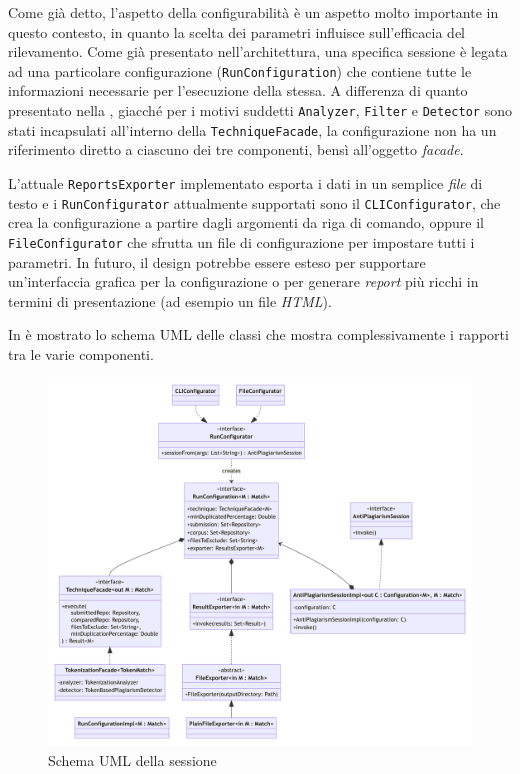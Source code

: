 Come già detto, l'aspetto della configurabilità è un aspetto molto importante in questo contesto, in quanto la scelta dei parametri influisce sull'efficacia del rilevamento.
%
Come già presentato nell'architettura, una specifica sessione è legata ad una particolare configurazione (\texttt{RunConfiguration}) che contiene tutte le informazioni necessarie per l'esecuzione della stessa.
%
A differenza di quanto presentato nella , giacché per i motivi suddetti \texttt{Analyzer}, \texttt{Filter} e \texttt{Detector} sono stati incapsulati all'interno della \texttt{TechniqueFacade}, la configurazione non ha un riferimento diretto a ciascuno dei tre componenti, bensì all'oggetto \textit{facade}.

L'attuale \texttt{ReportsExporter} implementato esporta i dati in un semplice \textit{file} di testo e i \texttt{RunConfigurator} attualmente supportati sono il \texttt{CLIConfigurator}, che crea la configurazione a partire dagli argomenti da riga di comando, oppure il \texttt{FileConfigurator} che sfrutta un file di configurazione per impostare tutti i parametri.
%
In futuro, il design potrebbe essere esteso per supportare un'interfaccia grafica per la configurazione o per generare \textit{report} più ricchi in termini di presentazione (ad esempio un file \textit{HTML}).

In  è mostrato lo schema UML delle classi che mostra complessivamente i rapporti tra le varie componenti.


\begin{figure}
    \centering
    \includegraphics[width=0.9\textheight]{resources/img/02-session.pdf}
    \caption{Schema UML della sessione}
    \label{img:02-session}
\end{figure}

